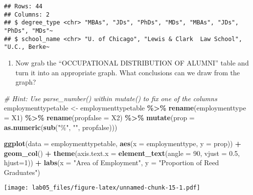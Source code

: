 \documentclass[
]{article}
\newenvironment{Shaded}{\begin{snugshade}}{\end{snugshade}}
\newcommand{\AttributeTok}[1]{\textcolor[rgb]{0.13,0.29,0.53}{#1}}
\newcommand{\CommentTok}[1]{\textcolor[rgb]{0.56,0.35,0.01}{\textit{#1}}}
\newcommand{\DecValTok}[1]{\textcolor[rgb]{0.00,0.00,0.81}{#1}}
\newcommand{\FloatTok}[1]{\textcolor[rgb]{0.00,0.00,0.81}{#1}}
\newcommand{\FunctionTok}[1]{\textcolor[rgb]{0.13,0.29,0.53}{\textbf{#1}}}
\newcommand{\NormalTok}[1]{#1}
\newcommand{\OtherTok}[1]{\textcolor[rgb]{0.56,0.35,0.01}{#1}}
\newcommand{\SpecialCharTok}[1]{\textcolor[rgb]{0.81,0.36,0.00}{\textbf{#1}}}
\newcommand{\StringTok}[1]{\textcolor[rgb]{0.31,0.60,0.02}{#1}}
\providecommand{\tightlist}{%
  \setlength{\itemsep}{0pt}\setlength{\parskip}{0pt}}
\begin{document}
\begin{verbatim}
## Rows: 44
## Columns: 2
## $ degree_type <chr> "MBAs", "JDs", "PhDs", "MDs", "MBAs", "JDs", "PhDs", "MDs"~
## $ school_name <chr> "U. of Chicago", "Lewis & Clark  Law School", "U.C., Berke~
\end{verbatim}

\begin{enumerate}
\def\labelenumi{\alph{enumi}.}
\setcounter{enumi}{3}
\tightlist
\item
  Now grab the ``OCCUPATIONAL DISTRIBUTION OF ALUMNI'' table and turn it
  into an appropriate graph. What conclusions can we draw from the
  graph?
\end{enumerate}

\begin{Shaded}
\begin{Highlighting}[]
\CommentTok{\# Hint: Use \textasciigrave{}parse\_number()\textasciigrave{} within \textasciigrave{}mutate()\textasciigrave{} to fix one of the columns}
\NormalTok{employmenttypetable }\OtherTok{\textless{}{-}}\NormalTok{ employmenttypetable }\SpecialCharTok{\%\textgreater{}\%}
\FunctionTok{rename}\NormalTok{(}\AttributeTok{employmenttype =}\NormalTok{ X1) }\SpecialCharTok{\%\textgreater{}\%}
\FunctionTok{rename}\NormalTok{(}\AttributeTok{propfalse =}\NormalTok{ X2) }\SpecialCharTok{\%\textgreater{}\%}
  \FunctionTok{mutate}\NormalTok{(}\AttributeTok{prop =} \FunctionTok{as.numeric}\NormalTok{(}\FunctionTok{sub}\NormalTok{(}\StringTok{"\%"}\NormalTok{, }\StringTok{""}\NormalTok{, propfalse)))}

\FunctionTok{ggplot}\NormalTok{(}\AttributeTok{data =}\NormalTok{ employmenttypetable, }\FunctionTok{aes}\NormalTok{(}\AttributeTok{x =}\NormalTok{ employmenttype, }\AttributeTok{y =}\NormalTok{ prop)) }\SpecialCharTok{+}
  \FunctionTok{geom\_col}\NormalTok{() }\SpecialCharTok{+}
  \FunctionTok{theme}\NormalTok{(}\AttributeTok{axis.text.x =} \FunctionTok{element\_text}\NormalTok{(}\AttributeTok{angle =} \DecValTok{90}\NormalTok{, }\AttributeTok{vjust =} \FloatTok{0.5}\NormalTok{, }\AttributeTok{hjust=}\DecValTok{1}\NormalTok{)) }\SpecialCharTok{+}
  \FunctionTok{labs}\NormalTok{(}\AttributeTok{x =} \StringTok{"Area of Employment"}\NormalTok{, }\AttributeTok{y =} \StringTok{"Proportion of Reed Graduates"}\NormalTok{)}
\end{Highlighting}
\end{Shaded}

\texttt{[image: lab05\_files/figure-latex/unnamed-chunk-15-1.pdf]}
\end{document}
